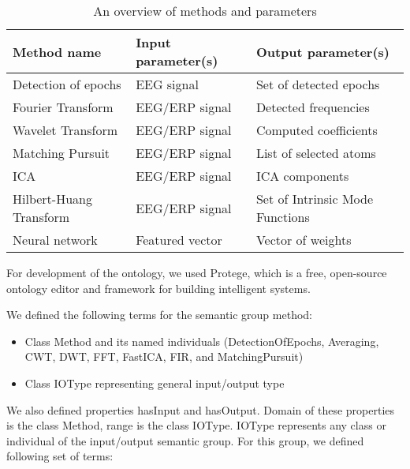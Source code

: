 \documentclass[a4paper,twoside]{article}
\begin{document}
\begin{table}[h]
\caption{An overview of methods and parameters}\label{tab:example1} \centering
\begin{tabular}{|p{2cm}|p{2cm}|p{2cm}|}
  \hline
  Method name & Input parameter(s) & Output parameter(s) \\
  \hline
  Detection of epochs & EEG signal &  Set of detected epochs \\
  \hline
  Fourier Transform & EEG/ERP signal &  Detected frequencies \\
  \hline
  Wavelet Transform & EEG/ERP signal &  Computed coefficients \\
  \hline
  Matching Pursuit & EEG/ERP signal &  List of selected atoms \\
  \hline
  ICA & EEG/ERP signal &  ICA components \\
  \hline
  Hilbert-Huang Transform & EEG/ERP signal & Set of Intrinsic Mode Functions \\
  \hline
  Neural network & Featured vector & Vector of weights \\
  \hline
\end{tabular}
\end{table}


For development of the ontology, we used Protege, which is a free, open-source ontology editor and framework for building intelligent systems.

We defined the following terms for the semantic group method:
\begin{itemize}
\item Class Method and its named individuals (DetectionOfEpochs, Averaging, CWT, DWT, FFT, FastICA, FIR, and MatchingPursuit)
\item Class IOType representing general input/output type
\end{itemize}

We also defined properties hasInput and hasOutput. Domain of these properties is the class Method, range is the class IOType. IOType represents any class or individual of the input/output semantic group. For this group, we defined following set of terms:
\end{document}
